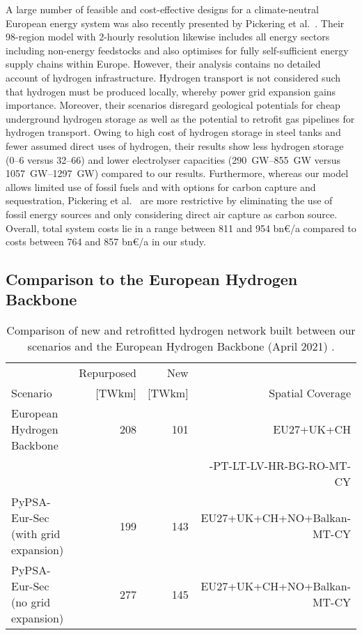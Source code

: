 A large number of feasible and cost-effective designs for a climate-neutral
European energy system was also recently presented by Pickering et
al.~\cite{pickeringDiversityOptions}. Their 98-region model with 2-hourly
resolution likewise includes all energy sectors including non-energy feedstocks
and also optimises for fully self-sufficient energy supply chains within Europe.
However, their analysis contains no detailed account of hydrogen infrastructure.
Hydrogen transport is not considered such that hydrogen must be
produced locally, whereby power grid expansion gains importance. Moreover,
their scenarios disregard geological potentials for cheap underground hydrogen
storage as well as the potential to retrofit gas pipelines for hydrogen
transport. Owing to high cost of hydrogen storage in steel tanks and fewer
assumed direct uses of hydrogen, their results show less hydrogen storage
(\SIrange{0}{6}{\twh} versus \SIrange{32}{66}{\twh}) and lower electrolyser
capacities (\SIrange{290}{855}{\giga\watt} versus
\SIrange{1057}{1297}{\giga\watt}) compared to our results. Furthermore, whereas
our model allows limited use of fossil fuels and with options for carbon capture
and sequestration, Pickering et al.~\cite{pickeringDiversityOptions} are more
restrictive by eliminating the use of fossil energy sources and only considering
direct air capture as carbon source. Overall, total system costs lie in a range
between 811 and 954 bn\euro/a compared to costs between 764 and 857 bn\euro/a in
our study.

\subsection*{Comparison to the European Hydrogen Backbone}

\begin{table}
  \caption{Comparison of new and retrofitted hydrogen network built between our scenarios and the European Hydrogen Backbone (April 2021) \cite{gasforclimateExtendingEuropean2021}.}
  \label{tab:ehb}
  \centering
  \footnotesize
  \begin{tabular}{lrrr}
      \toprule
       & Repurposed & New &  \\
       Scenario& [TWkm] & [TWkm] & Spatial Coverage \\
      \midrule
      European Hydrogen Backbone \cite{gasforclimateExtendingEuropean2021} & 208 & 101 & EU27+UK+CH\\
      && & -PT-LT-LV-HR-BG-RO-MT-CY\\
      PyPSA-Eur-Sec (with grid expansion) & 199 & 143 & EU27+UK+CH+NO+Balkan-MT-CY \\
      PyPSA-Eur-Sec (no grid expansion) & 277 & 145 & EU27+UK+CH+NO+Balkan-MT-CY \\
      \bottomrule
    \end{tabular}
\end{table}

